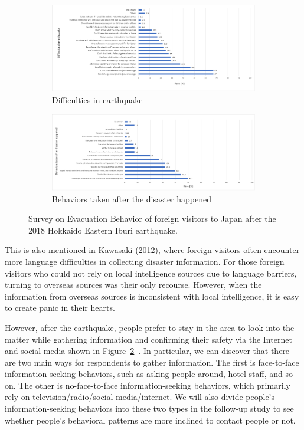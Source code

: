 \begin{figure}[h]
  \begin{subfigure}{\textwidth}
    \includegraphics[width=\linewidth]{Figure/Figure2a.png}
    \caption{Difficulties in earthquake}
    \label{fig2a}
  \end{subfigure}
  \begin{subfigure}{\textwidth}
    \includegraphics[width=\linewidth]{Figure/Figure2b.png}
    \caption{Behaviors taken after the disaster happened}
    \label{fig2b}
  \end{subfigure}
  \centering
  \caption[Survey on Evacuation Behavior of foreign visitors to Japan after the 2018 Hokkaido Eastern Iburi earthquake.]{Survey on Evacuation Behavior of foreign visitors to Japan after the 2018 Hokkaido Eastern Iburi earthquake.\protect\footnotemark }
  \label{fig2}
\end{figure}

This is also mentioned in Kawasaki (2012), where foreign visitors often encounter more language difficulties in collecting disaster information. For those foreign visitors who could not rely on local intelligence sources due to language barriers, turning to overseas sources was their only recourse. However, when the information from overseas sources is inconsistent with local intelligence, it is easy to create panic in their hearts.

However, after the earthquake, people prefer to stay in the area to look into the matter while gathering information and confirming their safety via the Internet and social media shown in Figure~\ref{fig2b}~\cite{ref50}. In particular, we can discover that there are two main ways for respondents to gather information. The first is face-to-face information-seeking behaviors, such as asking people around, hotel staff, and so on. The other is no-face-to-face information-seeking behaviors, which primarily rely on television/radio/social media/internet. We will also divide people's information-seeking behaviors into these two types in the follow-up study to see whether people's behavioral patterns are more inclined to contact people or not. 

